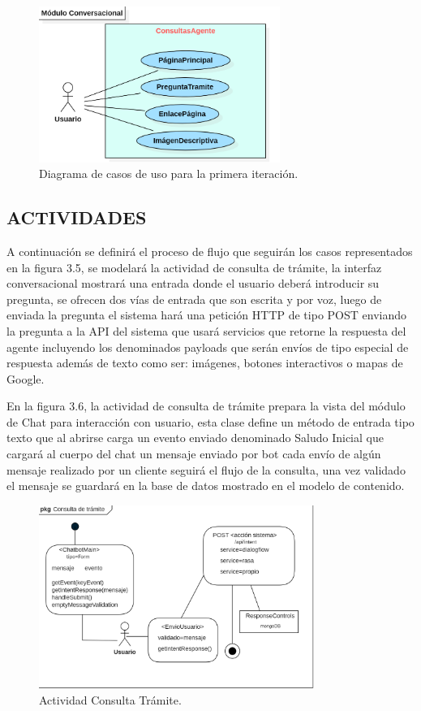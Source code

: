 \documentclass[letter, openright, 12pt]{book}
\begin{document}
\begin{figure}[H]
\centering
\includegraphics[width=0.7\textwidth]{figura3_5}
 \caption{Diagrama de casos de uso para la primera iteración.}
\label{fig:figura3_5}
\end{figure}

\subsection{ACTIVIDADES}
A continuación se definirá el proceso de flujo que seguirán los casos representados en la figura 3.5, se modelará la actividad de consulta de trámite, la interfaz conversacional mostrará una entrada donde el usuario deberá introducir su pregunta, se ofrecen dos vías de entrada que son escrita y por voz, luego de enviada la pregunta el sistema hará una petición HTTP de tipo POST enviando la pregunta a la API del sistema que usará servicios que retorne la respuesta del agente incluyendo los denominados payloads que serán envíos de tipo especial de respuesta además de texto como ser: imágenes, botones interactivos o mapas de Google. \par
En la figura 3.6, la actividad de consulta de trámite prepara la vista del módulo de Chat para interacción con usuario, esta clase define un método de entrada tipo texto que al abrirse carga un evento enviado denominado Saludo Inicial que cargará al cuerpo del chat un mensaje enviado por bot cada envío de algún mensaje realizado por un cliente seguirá el flujo de la consulta, una vez validado el mensaje se guardará en la base de datos mostrado en el modelo de contenido. 


\begin{figure}[H]
\centering
\includegraphics[width=0.8\textwidth]{figura3_6}
 \caption{Actividad Consulta Trámite.}
\label{fig:figura3_6}
\end{figure}
\end{document}

